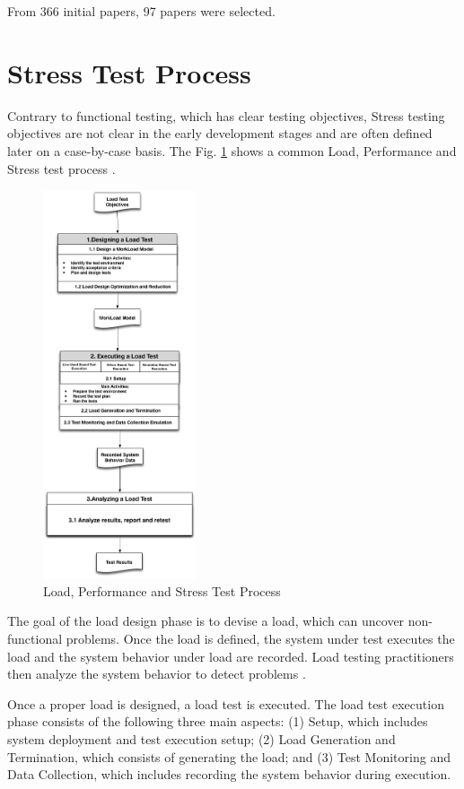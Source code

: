 \documentclass[espaco=umemeio,chapter=TITLE,twoside,openright]{abnt}
\begin{document}
From 366 initial papers, 97 papers were selected.

\section{Stress Test Process}

Contrary to functional testing, which has clear testing objectives, Stress testing objectives are not clear in the early development stages and are often defined later on a case-by-case basis. The Fig. \ref{fig:testprocess} shows a common Load, Performance and Stress test process  \cite{Jiang2010}.

\begin{figure}[!ht]
\centering
\includegraphics[width=0.4\textwidth]{./images/testprocess.png}
\caption{Load, Performance and Stress Test Process \cite{Jiang2010}\cite{Erinle2013}}
\label{fig:testprocess}
\end{figure}


The goal of the load design phase is to devise a load, which can uncover non-functional problems. Once the load is defined, the system under test executes the load and the system behavior under load are recorded. Load testing practitioners then analyze the system behavior to detect problems \cite{Jiang2010}.

Once a proper load is designed, a load test is executed. The load test execution phase consists of the following three main aspects: (1) Setup, which includes system deployment and test execution setup; (2) Load Generation and Termination, which consists of generating the load; and (3) Test Monitoring and Data Collection, which includes recording the system behavior during execution\cite{Jiang2010}.
\end{document}

